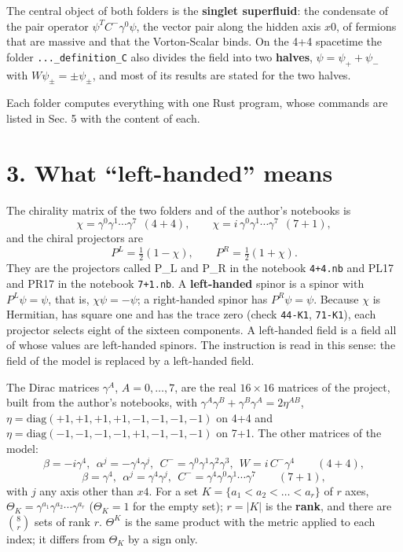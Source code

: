 \documentclass[
  10pt,
]{article}
\begin{document}
The central object of both folders is the \textbf{singlet superfluid}:
the condensate of the pair operator \(\psi^TC^-\gamma^{0}\psi\), the
vector pair along the hidden axis \(x0\), of fermions that are massive
and that the Vorton-Scalar binds. On the 4+4 spacetime the folder
\texttt{...\_definition\_C} also divides the field into two
\textbf{halves}, \(\psi=\psi_++\psi_-\) with \(W\psi_\pm=\pm\psi_\pm\),
and most of its results are stated for the two halves.

Each folder computes everything with one Rust program, whose commands
are listed in Sec. 5 with the content of each.

\hypertarget{what-left-handed-means}{%
\section{3. What ``left-handed'' means}\label{what-left-handed-means}}

The chirality matrix of the two folders and of the author's notebooks is
\[\chi=\gamma^{0}\gamma^{1}\cdots\gamma^{7}\ \ (4+4),\qquad\chi=i\,\gamma^{0}\gamma^{1}\cdots\gamma^{7}\ \ (7+1),\]
and the chiral projectors are
\[P^L=\tfrac12(1-\chi),\qquad P^R=\tfrac12(1+\chi).\] They are the
projectors called P\_L and P\_R in the notebook \texttt{4+4.nb} and PL17
and PR17 in the notebook \texttt{7+1.nb}. A \textbf{left-handed} spinor
is a spinor with \(P^L\psi=\psi\), that is, \(\chi\psi=-\psi\); a
right-handed spinor has \(P^R\psi=\psi\). Because \(\chi\) is Hermitian,
has square one and has the trace zero (check \texttt{44-K1},
\texttt{71-K1}), each projector selects eight of the sixteen components.
A left-handed field is a field all of whose values are left-handed
spinors. The instruction is read in this sense: the field of the model
is replaced by a left-handed field.

The Dirac matrices \(\gamma^A\), \(A=0,\dots,7\), are the real
\(16\times16\) matrices of the project, built from the author's
notebooks, with \(\gamma^A\gamma^B+\gamma^B\gamma^A=2\eta^{AB}\),
\(\eta=\mathrm{diag}(+1,+1,+1,+1,-1,-1,-1,-1)\) on 4+4 and
\(\eta=\mathrm{diag}(-1,-1,-1,-1,+1,-1,-1,-1)\) on 7+1. The other
matrices of the model:
\[\beta=-i\gamma^{4},\ \ \alpha^j=-\gamma^{4}\gamma^{j},\ \ C^-=\gamma^{0}\gamma^{1}\gamma^{2}\gamma^{3},\ \ W=i\,C^-\gamma^{4}\qquad(4+4),\]
\[\beta=\gamma^{4},\ \ \alpha^j=\gamma^{4}\gamma^{j},\ \ C^-=\gamma^{4}\gamma^{0}\gamma^{1}\cdots\gamma^{7}\qquad(7+1),\]
with \(j\) any axis other than \(x4\). For a set
\(K=\{a_1<a_2<\dots<a_r\}\) of \(r\) axes,
\(\Theta_K=\gamma^{a_1}\gamma^{a_2}\cdots\gamma^{a_r}\) (\(\Theta_K=1\)
for the empty set); \(r=|K|\) is the \textbf{rank}, and there are
\(\binom8r\) sets of rank \(r\). \(\Theta^K\) is the same product with
the metric applied to each index; it differs from \(\Theta_K\) by a sign
only.
\end{document}
